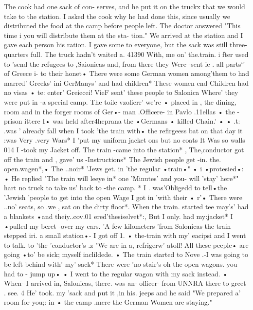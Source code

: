 The cook had one sack of con-
serves, and he put it on the truckx that we would take to the station.
I asked the 
cook why he had done this, since usually we distributed the food at the camp before 
people left.
The doctor answered "This time i you will distribute them at the sta-
tion."
We arrived at the station and I gave each person his ration.
I gave some to 
everyone, but the sack was still three-quarters full.
The truck hadn't waited a.
41390 
With, me on' the.train.
i 
fter used to 'send the refugees to ,Saionicas and, from there they Were -sent ie .
all 
parts`' of Greece i- to their honet• There were some German women among'them to had 
marred' Greeks' ini GerManys' and had children* These women end Children had no visas 
• te: enter' Greiecei!
VieF sent' these people to Salonica Where' they were put in -a special 
camp.
The toile vzolierr' we're • placed in , the dining, room and in the forger rooms of Ger•- 
man .Officere- in Pavlo .11ellas • the - prison ittere I• was held after4heprana the •Germans 
• killed Chain.'
• 
• 
.t: 
.was ' already 
fall when I took 'the train with• the refirgeess bat on that day it 
:was Very .very Wars* I 'put my uniform jacket ons but no coats It Was so walls 014 
I -took my Jacket off.
The train -came into the station* , The,conductor got off the 
train and , gave' us -Instructions* The Jewish people get -in.
the.
open.wagen*,• The ..noir* 
'Jews get.
in 'the regular •train•" • i •protesied•: • He replied "The train will leeye in* 
one 'Minutes' and you- will 'stay' here*" hart no truck to take us' back to -the camp.
* I .
was'Obligedd to tell•the 'Jewish 'people to get into the open Wage%
I got in 'with 
their • r'• There were ..no' seats, so .we , sat on the dirty floor*.
When the train.
started tee 
may's' %
had a blankets •and theiy..cov.01 
ered'thesiselvet*:, But I only.
had my:jacket* I •pulled my beret -over my ears.
'A few kilometers 'from Salonicas the train stepped iri.
a small station•- I got off 1.
• the-train with my' eacipsi and I went to talk.
to 'the 'conductor's .z "We are in a, refrigerw' 
atoll!
All these peeple• are going •to' be sick; myself inclildede.
• The train started 
to Nove .-I was going to be left behind with' my' sack* There were 'no stair's oh the 
open wagons.
you- had to - jump up• • I went to the regular wagon with my sack instead.
• When- I arrived in, Salonicas, there.
was an- officer- from UNNRA there to greet .
see.
4 
He' took.
my 'sack and put it ,in his.
jeeps and he said "We prepared a' room for you;: in 
• the camp .mere the German Women are staying."
